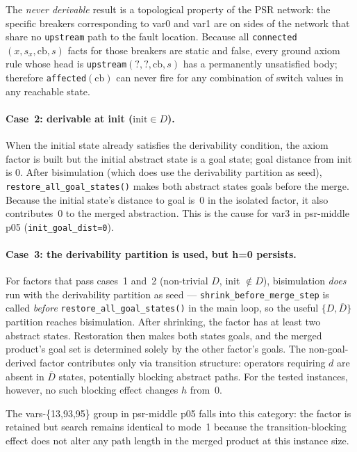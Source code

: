\documentclass[11pt,a4paper]{article}
\begin{document}
The \emph{never derivable} result is a topological property of the PSR network:
the specific breakers corresponding to var0 and var1 are on sides of the
network that share no \texttt{upstream} path to the fault location.  Because
all \texttt{connected}$(x, s_x, \mathrm{cb}, s)$ facts for those breakers are
static and false, every ground axiom rule whose head is
\texttt{upstream}$(?, ?, \mathrm{cb}, s)$ has a permanently unsatisfied body;
therefore \texttt{affected}$(\mathrm{cb})$ can never fire for any combination
of switch values in any reachable state.

\paragraph{Case~2: derivable at init ($\mathrm{init} \in D$).}
When the initial state already satisfies the derivability condition, the axiom
factor is built but the initial abstract state is a goal state; goal distance
from init is 0.  After bisimulation (which does use the derivability partition
as seed), \texttt{restore\_all\_goal\_states()} makes both abstract states
goals before the merge.  Because the initial state's distance to goal is~0 in
the isolated factor, it also contributes~0 to the merged abstraction.
This is the cause for var3 in psr-middle p05 (\texttt{init\_goal\_dist=0}).

\paragraph{Case~3: the derivability partition is used, but h=0 persists.}
For factors that pass cases~1 and~2 (non-trivial $D$, init $\notin D$),
bisimulation \emph{does} run with the derivability partition as seed ---
\texttt{shrink\_before\_merge\_step} is called \emph{before}
\texttt{restore\_all\_goal\_states()} in the main loop, so the useful
$\{D, \overline{D}\}$ partition reaches bisimulation.  After shrinking, the
factor has at least two abstract states.  Restoration then makes both states
goals, and the merged product's goal set is determined solely by the other
factor's goals.  The non-goal-derived factor contributes only via transition
structure: operators requiring $d$ are absent in $\overline{D}$ states,
potentially blocking abstract paths.  For the tested instances, however, no
such blocking effect changes $h$ from~0.

The vars-\{13,93,95\} group in psr-middle p05 falls into this category:
the factor is retained but search remains identical to mode~1 because the
transition-blocking effect does not alter any path length in the merged
product at this instance size.
\end{document}
